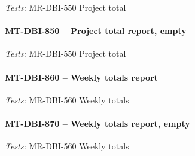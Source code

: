 \textit{Tests: } MR-DBI-550 Project total

\paragraph{MT-DBI-850 -- Project total report, empty}

\textit{Tests: } MR-DBI-550 Project total

\paragraph{MT-DBI-860 -- Weekly totals report}

\textit{Tests: } MR-DBI-560 Weekly totals

\paragraph{MT-DBI-870 -- Weekly totals report, empty}

\textit{Tests: } MR-DBI-560 Weekly totals
